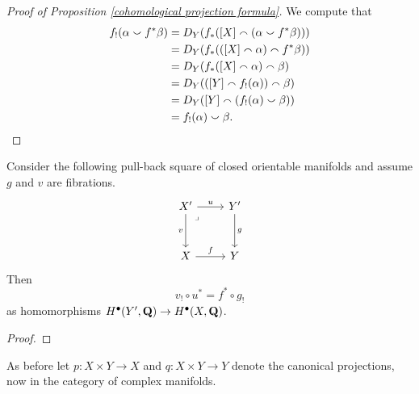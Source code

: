 \begin{proof}[Proof of Proposition \ref{cohomological projection formula}]
    We compute that
    \begin{align*}
        f_!(\alpha \smallsmile f^*\beta) &=
        D_Y(f_*([X] \smallfrown (\alpha \smallsmile f^*\beta))) \\
        &= D_Y(f_*(([X] \smallfrown \alpha) \smallfrown f^*\beta)) \\
        &= D_Y(f_*([X] \smallfrown \alpha) \smallfrown \beta) \\
        &= D_Y(([Y] \smallfrown f_!(\alpha)) \smallfrown \beta) \\
        &= D_Y([Y] \smallfrown (f_!(\alpha) \smallsmile \beta)) \\
        &= f_!(\alpha) \smallsmile \beta. \qedhere
    \end{align*}
\end{proof}

\begin{proposition}
    Consider the following pull-back square of closed orientable manifolds and assume $g$ and $v$ are fibrations.
    \[\begin{tikzcd}[row sep = 3em]
        {X'} & {Y'} \\
        X & Y
        \arrow["u", from=1-1, to=1-2]
        \arrow["v"', from=1-1, to=2-1]
        \arrow["\lrcorner"{anchor=center, pos=0.125}, draw=none, from=1-1, to=2-2]
        \arrow["g", from=1-2, to=2-2]
        \arrow["f", from=2-1, to=2-2]
    \end{tikzcd}\]
    Then
    \begin{equation}
        \label{eq: cohomological base change}
        v_! \circ u^* = f^* \circ g_!
    \end{equation}
    as homomorphisms $H^{\bullet}(Y', \mathbf Q) \to H^{\bullet}(X, \mathbf Q)$.
\end{proposition}

\begin{proof}
\end{proof}

As before let $p \colon X \times Y \to X$ and $q \colon X \times Y \to Y$ denote the canonical projections, now in the category of complex manifolds. 


